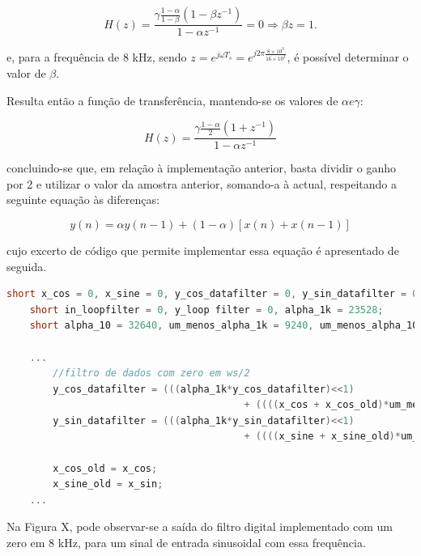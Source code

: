 \documentclass[11pt]{article}
\numberwithin{equation}{section}
\begin{document}
\vspace{-3mm}
\begin{equation}
H(z) = \frac{\gamma \frac{1-\alpha}{1-\beta} (1-\beta z^{-1})}{1-\alpha z^{-1}} = 0 \Rightarrow \beta z = 1.
\end{equation}

\vspace{1mm}
e, para a frequência de 8 kHz, sendo $z = e^{j\omega T_s} = e^{j2\pi \frac{8\times 10^3}{16\times 10^3}}$, é possível determinar o valor de $\beta$.
	
Resulta então a função de transferência, mantendo-se os valores de $\alpha e \gamma$:

\vspace{-3mm}
\begin{equation}
H(z) = \frac{\gamma \frac{1-\alpha}{2} (1+z^{-1})}{1-\alpha z^{-1}}
\end{equation}

\vspace{1mm}
concluindo-se que, em relação à implementação anterior, basta dividir o ganho por 2 e utilizar o valor da amostra anterior, somando-a à actual, respeitando a seguinte equação às diferenças:

\vspace{-3mm}
\begin{equation}
y(n) = \alpha y(n-1) +  (1-\alpha)[x(n) + x(n-1)]
\end{equation} 

\vspace{1mm}
cujo excerto de código que permite implementar essa equação é apresentado de seguida.

\begin{lstlisting}[language=C]
	short x_cos = 0, x_sine = 0, y_cos_datafilter = 0, y_sin_datafilter = 0;  
	short in_loopfilter = 0, y_loop filter = 0, alpha_1k = 23528; 
	short alpha_10 = 32640, um_menos_alpha_1k = 9240, um_menos_alpha_10 = 127;
	
	...
		//filtro de dados com zero em ws/2
		y_cos_datafilter = (((alpha_1k*y_cos_datafilter)<<1) 
										 + ((((x_cos + x_cos_old)*um_menos_alpha_1k)>>1)<<1))>>16;
		y_sin_datafilter = (((alpha_1k*y_sin_datafilter)<<1) 
										 + ((((x_sine + x_sine_old)*um_menos_alpha_1k)>>1)<<1))>>16;

		x_cos_old = x_cos;
		x_sine_old = x_sin;
	...
\end{lstlisting}

Na Figura X, pode observar-se a saída do filtro digital implementado com um zero em 8 kHz, para um sinal de entrada sinusoidal com essa frequência. 
\end{document}
